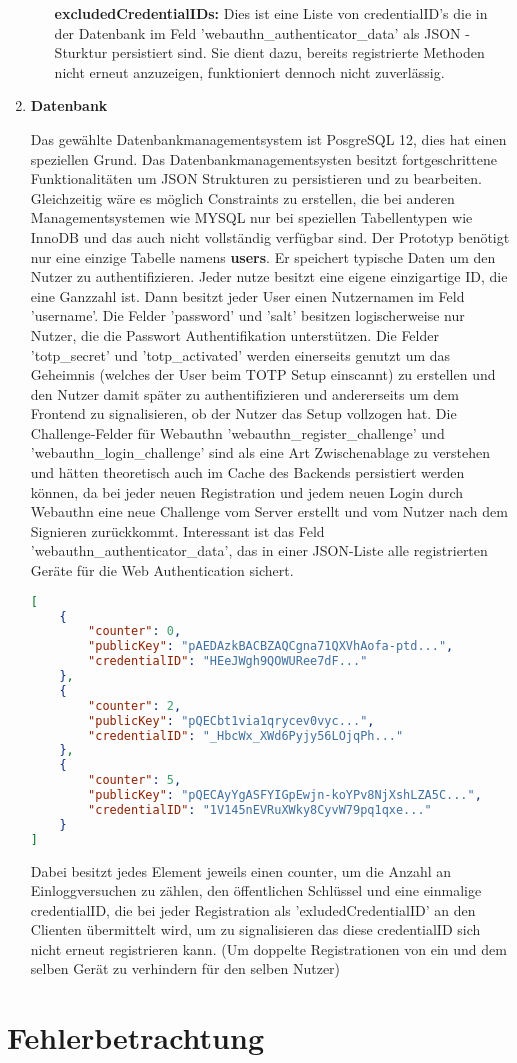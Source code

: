 \begin{enumerate}
\begin{itemize}
\textbf{excludedCredentialIDs:} Dies ist eine Liste von credentialID's die in der Datenbank im Feld 'webauthn\_authenticator\_data' als JSON - Sturktur persistiert sind. Sie dient dazu, bereits registrierte Methoden nicht erneut anzuzeigen, funktioniert dennoch nicht zuverlässig.
\end{itemize}
\newpage

\item \textbf{Datenbank}

Das gewählte Datenbankmanagementsystem ist PosgreSQL 12, dies hat einen speziellen Grund. Das Datenbankmanagementsysten besitzt fortgeschrittene Funktionalitäten um JSON Strukturen zu persistieren und zu bearbeiten. Gleichzeitig wäre es möglich Constraints zu erstellen, die bei anderen Managementsystemen wie MYSQL nur bei speziellen Tabellentypen wie InnoDB und das auch nicht vollständig verfügbar sind. Der Prototyp benötigt nur eine einzige Tabelle namens \textbf{users}. Er speichert typische Daten um den Nutzer zu authentifizieren. Jeder nutze besitzt eine eigene einzigartige ID, die eine Ganzzahl ist. Dann besitzt jeder User einen Nutzernamen im Feld 'username'. Die Felder 'password' und 'salt' besitzen logischerweise nur Nutzer, die die Passwort Authentifikation unterstützen. Die Felder 'totp\_secret' und 'totp\_activated' werden einerseits genutzt um das Geheimnis (welches der User beim TOTP Setup einscannt) zu erstellen und den Nutzer damit später zu authentifizieren und andererseits um dem Frontend zu signalisieren, ob der Nutzer das Setup vollzogen hat. Die Challenge-Felder für Webauthn 'webauthn\_register\_challenge' und 'webauthn\_login\_challenge' sind als eine Art Zwischenablage zu verstehen und hätten theoretisch auch im Cache des Backends persistiert werden können, da bei jeder neuen Registration und jedem neuen Login durch Webauthn eine neue Challenge vom Server erstellt und vom Nutzer nach dem Signieren zurückkommt. Interessant ist das Feld 'webauthn\_authenticator\_data', das in einer JSON-Liste alle registrierten Geräte für die Web Authentication sichert.

 \begin{lstlisting}[language=json,firstnumber=1]
[
    {
        "counter": 0,
        "publicKey": "pAEDAzkBACBZAQCgna71QXVhAofa-ptd...",
        "credentialID": "HEeJWgh9QOWURee7dF..."
    },
    {
        "counter": 2,
        "publicKey": "pQECbt1via1qrycev0vyc...",
        "credentialID": "_HbcWx_XWd6Pyjy56LOjqPh..."
    },
    {
        "counter": 5,
        "publicKey": "pQECAyYgASFYIGpEwjn-koYPv8NjXshLZA5C...",
        "credentialID": "1V145nEVRuXWky8CyvW79pq1qxe..."
    }
]
\end{lstlisting}

Dabei besitzt jedes Element jeweils einen counter, um die Anzahl an Einloggversuchen zu zählen, den öffentlichen Schlüssel und eine einmalige credentialID, die bei jeder Registration als 'exludedCredentialID' an den Clienten übermittelt wird, um zu signalisieren das diese credentialID sich nicht erneut registrieren kann. (Um doppelte Registrationen von ein und dem selben Gerät zu verhindern für den selben Nutzer)
\end{enumerate}

\section{Fehlerbetrachtung}
